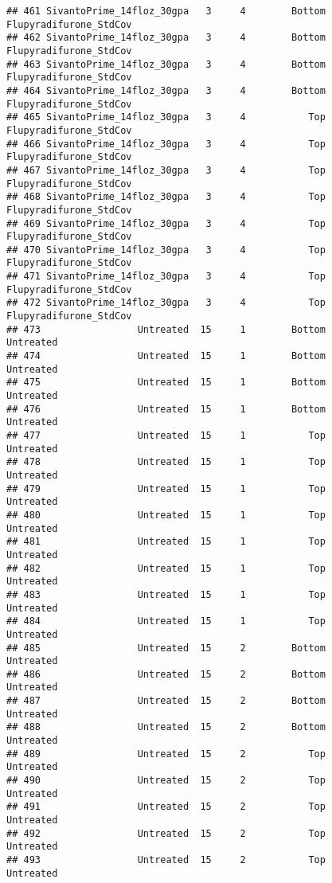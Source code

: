 \documentclass[
]{article}
\begin{document}
\begin{verbatim}
## 461 SivantoPrime_14floz_30gpa   3     4        Bottom Flupyradifurone_StdCov
## 462 SivantoPrime_14floz_30gpa   3     4        Bottom Flupyradifurone_StdCov
## 463 SivantoPrime_14floz_30gpa   3     4        Bottom Flupyradifurone_StdCov
## 464 SivantoPrime_14floz_30gpa   3     4        Bottom Flupyradifurone_StdCov
## 465 SivantoPrime_14floz_30gpa   3     4           Top Flupyradifurone_StdCov
## 466 SivantoPrime_14floz_30gpa   3     4           Top Flupyradifurone_StdCov
## 467 SivantoPrime_14floz_30gpa   3     4           Top Flupyradifurone_StdCov
## 468 SivantoPrime_14floz_30gpa   3     4           Top Flupyradifurone_StdCov
## 469 SivantoPrime_14floz_30gpa   3     4           Top Flupyradifurone_StdCov
## 470 SivantoPrime_14floz_30gpa   3     4           Top Flupyradifurone_StdCov
## 471 SivantoPrime_14floz_30gpa   3     4           Top Flupyradifurone_StdCov
## 472 SivantoPrime_14floz_30gpa   3     4           Top Flupyradifurone_StdCov
## 473                 Untreated  15     1        Bottom              Untreated
## 474                 Untreated  15     1        Bottom              Untreated
## 475                 Untreated  15     1        Bottom              Untreated
## 476                 Untreated  15     1        Bottom              Untreated
## 477                 Untreated  15     1           Top              Untreated
## 478                 Untreated  15     1           Top              Untreated
## 479                 Untreated  15     1           Top              Untreated
## 480                 Untreated  15     1           Top              Untreated
## 481                 Untreated  15     1           Top              Untreated
## 482                 Untreated  15     1           Top              Untreated
## 483                 Untreated  15     1           Top              Untreated
## 484                 Untreated  15     1           Top              Untreated
## 485                 Untreated  15     2        Bottom              Untreated
## 486                 Untreated  15     2        Bottom              Untreated
## 487                 Untreated  15     2        Bottom              Untreated
## 488                 Untreated  15     2        Bottom              Untreated
## 489                 Untreated  15     2           Top              Untreated
## 490                 Untreated  15     2           Top              Untreated
## 491                 Untreated  15     2           Top              Untreated
## 492                 Untreated  15     2           Top              Untreated
## 493                 Untreated  15     2           Top              Untreated

\end{verbatim}
\end{document}
